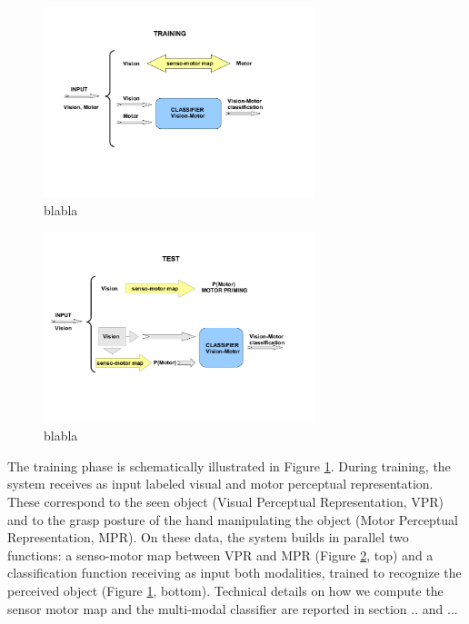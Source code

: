 
\begin{figure}[h!]
	\centering
	\includegraphics[width=0.7\textwidth]{images/train_fig}
	\caption{blabla}
	\label{fig:training-scheme}
\end{figure}

\begin{figure}[h!]
        \centering
        \includegraphics[width=0.7\textwidth]{images/test_fig}
        \caption{blabla}
        \label{fig:test-scheme}
\end{figure}



The training phase is schematically illustrated in Figure \ref{fig:training-scheme}. During training, the system receives as input labeled visual and motor
perceptual representation. These correspond to the seen object (Visual Perceptual Representation, VPR) and to the grasp posture of the hand
manipulating the object (Motor Perceptual Representation, MPR). On these data, the system builds in parallel two functions: a senso-motor map
between VPR and MPR (Figure \ref{fig:test-scheme}, top) and a classification function receiving as input both modalities, trained
to recognize the perceived object (Figure \ref{fig:training-scheme}, bottom). Technical details on how we compute the sensor motor map and the
multi-modal classifier are reported in section .. and ...


